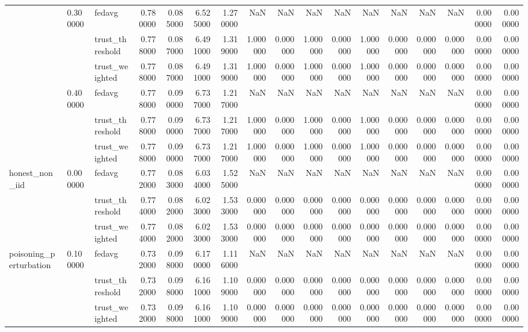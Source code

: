 \begin{tabular}{lllrrrrrrrrrrrrrr}
\cline{2-17}
 & \multirow[t]{3}{*}{0.300000} & fedavg & 0.780000 & 0.085000 & 6.525000 & 1.270000 & NaN & NaN & NaN & NaN & NaN & NaN & NaN & NaN & 0.000000 & 0.000000 \\
 &  & trust_threshold & 0.778000 & 0.087000 & 6.491000 & 1.319000 & 1.000000 & 0.000000 & 1.000000 & 0.000000 & 1.000000 & 0.000000 & 0.000000 & 0.000000 & 0.000000 & 0.000000 \\
 &  & trust_weighted & 0.778000 & 0.087000 & 6.491000 & 1.319000 & 1.000000 & 0.000000 & 1.000000 & 0.000000 & 1.000000 & 0.000000 & 0.000000 & 0.000000 & 0.000000 & 0.000000 \\
\cline{2-17}
 & \multirow[t]{3}{*}{0.400000} & fedavg & 0.778000 & 0.090000 & 6.737000 & 1.217000 & NaN & NaN & NaN & NaN & NaN & NaN & NaN & NaN & 0.000000 & 0.000000 \\
 &  & trust_threshold & 0.778000 & 0.090000 & 6.737000 & 1.217000 & 1.000000 & 0.000000 & 1.000000 & 0.000000 & 1.000000 & 0.000000 & 0.000000 & 0.000000 & 0.000000 & 0.000000 \\
 &  & trust_weighted & 0.778000 & 0.090000 & 6.737000 & 1.217000 & 1.000000 & 0.000000 & 1.000000 & 0.000000 & 1.000000 & 0.000000 & 0.000000 & 0.000000 & 0.000000 & 0.000000 \\
\cline{1-17} \cline{2-17}
\multirow[t]{3}{*}{honest_non_iid} & \multirow[t]{3}{*}{0.000000} & fedavg & 0.772000 & 0.083000 & 6.034000 & 1.525000 & NaN & NaN & NaN & NaN & NaN & NaN & NaN & NaN & 0.000000 & 0.000000 \\
 &  & trust_threshold & 0.774000 & 0.082000 & 6.023000 & 1.533000 & 0.000000 & 0.000000 & 0.000000 & 0.000000 & 0.000000 & 0.000000 & 0.000000 & 0.000000 & 0.000000 & 0.000000 \\
 &  & trust_weighted & 0.774000 & 0.082000 & 6.023000 & 1.533000 & 0.000000 & 0.000000 & 0.000000 & 0.000000 & 0.000000 & 0.000000 & 0.000000 & 0.000000 & 0.000000 & 0.000000 \\
\cline{1-17} \cline{2-17}
\multirow[t]{12}{*}{poisoning_perturbation} & \multirow[t]{3}{*}{0.100000} & fedavg & 0.732000 & 0.098000 & 6.170000 & 1.116000 & NaN & NaN & NaN & NaN & NaN & NaN & NaN & NaN & 0.000000 & 0.000000 \\
 &  & trust_threshold & 0.732000 & 0.098000 & 6.161000 & 1.109000 & 0.000000 & 0.000000 & 0.000000 & 0.000000 & 0.000000 & 0.000000 & 0.000000 & 0.000000 & 0.000000 & 0.000000 \\
 &  & trust_weighted & 0.732000 & 0.098000 & 6.161000 & 1.109000 & 0.000000 & 0.000000 & 0.000000 & 0.000000 & 0.000000 & 0.000000 & 0.000000 & 0.000000 & 0.000000 & 0.000000 \\

\end{tabular}

